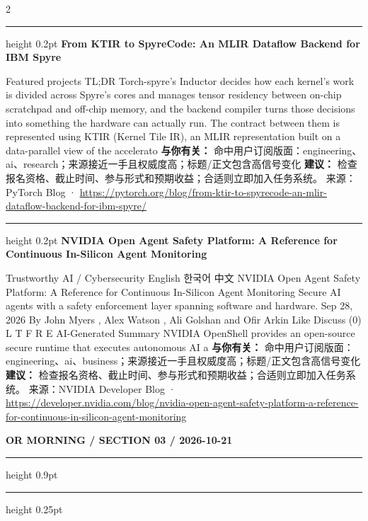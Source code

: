 \documentclass[10.5pt]{ctexart}
\begin{document}
\begin{multicols}{2}
\vspace{2mm}
\hrule height 0.2pt
\vspace{2mm}
{\large\bfseries From KTIR to SpyreCode: An MLIR Dataflow Backend for IBM Spyre}\par
Featured projects TL;DR Torch-spyre’s Inductor decides how each kernel’s work is divided across Spyre’s cores and manages tensor residency between on-chip scratchpad and off-chip memory, and the backend compiler turns those decisions into something the hardware can actually run. The contract between them is represented using KTIR (Kernel Tile IR), an MLIR representation built on a data-parallel view of the accelerato
\textbf{与你有关：} 命中用户订阅版面：engineering、ai、research；来源接近一手且权威度高；标题/正文包含高信号变化
\textbf{建议：} 检查报名资格、截止时间、参与形式和预期收益；合适则立即加入任务系统。
{\footnotesize\color{ormuted} 来源：PyTorch Blog · \url{https://pytorch.org/blog/from-ktir-to-spyrecode-an-mlir-dataflow-backend-for-ibm-spyre/}}
\vspace{2mm}
\hrule height 0.2pt
\vspace{2mm}
{\large\bfseries NVIDIA Open Agent Safety Platform: A Reference for Continuous In-Silicon Agent Monitoring}\par
Trustworthy AI / Cybersecurity English 한국어 中文 NVIDIA Open Agent Safety Platform: A Reference for Continuous In-Silicon Agent Monitoring Secure AI agents with a safety enforcement layer spanning software and hardware. Sep 28, 2026 By John Myers , Alex Watson , Ali Golshan and Ofir Arkin Like Discuss (0) L T F R E AI-Generated Summary NVIDIA OpenShell provides an open-source secure runtime that executes autonomous AI a
\textbf{与你有关：} 命中用户订阅版面：engineering、ai、business；来源接近一手且权威度高；标题/正文包含高信号变化
\textbf{建议：} 检查报名资格、截止时间、参与形式和预期收益；合适则立即加入任务系统。
{\footnotesize\color{ormuted} 来源：NVIDIA Developer Blog · \url{https://developer.nvidia.com/blog/nvidia-open-agent-safety-platform-a-reference-for-continuous-in-silicon-agent-monitoring}}
\end{multicols}
\newpage
{\small\bfseries OR MORNING / SECTION 03 / 2026-10-21}
\vspace{2mm}
\hrule height 0.9pt
\vspace{1.5mm}
\hrule height 0.25pt
\vspace{4mm}
\end{document}
